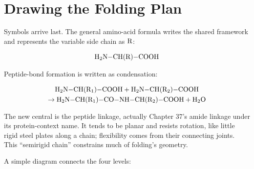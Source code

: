 \section{Drawing the Folding Plan}

Symbols arrive last. The general amino-acid formula writes the shared framework and represents the variable side chain as $\mathrm{R}$:

\[\mathrm{H_2N{-}CH(R){-}COOH}\]

Peptide-bond formation is written as condensation:

\[\begin{gathered}
\mathrm{H_2N{-}CH(R_1){-}COOH} + \mathrm{H_2N{-}CH(R_2){-}COOH} \\
\rightarrow \mathrm{H_2N{-}CH(R_1){-}CO{-}NH{-}CH(R_2){-}COOH} + \mathrm{H_2O}
\end{gathered}\]

The new central  is the peptide linkage, actually Chapter 37's amide linkage under its protein-context name. It tends to be planar and resists rotation, like little rigid steel plates along a chain; flexibility comes from their connecting joints. This ``semirigid chain'' constrains much of folding's geometry.

A simple diagram connects the four levels:

\begin{center}
\end{center}

